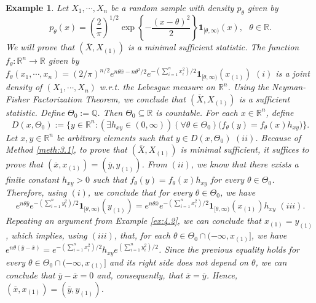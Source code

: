 \documentclass[12pt]{article}
\newtheorem{example}{Example}[section]
\begin{document}
\begin{example}
\label{ex:4.3}
Let $X_1,\cdots, X_n$ be a random sample with density $p_\theta $ given by
$$p_\theta (x)=\left(\frac{2}{\pi }\right)^{1/2}\exp \left\{-\frac{(x-\theta )^2}{2}\right\}\mathbf{1}_{[\theta ,\infty )}(x),\,\,\,\,\theta \in \mathbb{R}.$$
We will prove that $(\overline X,X_{(1)})$ is a minimal sufficient statistic. The function $f_\theta :\mathbb{R}^n\to \mathbb{R}$ given by $f_\theta (x_1,\cdots, x_n)=(2/\pi )^{n/2}e^{n\theta \overline x-n\theta ^2/2}e^{-(\sum _{i=1}^nx_i^2)/2}\mathbf{1}_{[\theta ,\infty )}(x_{(1)})\,\,(i)$ is a joint density of $(X_1,\cdots, X_n)$ w.r.t. the Lebesgue measure on $\mathbb{R}^n$. Using the Neyman-Fisher Factorization Theorem, we conclude that $(\overline X,X_{(1)})$ is a sufficient statistic. Define $\Theta _0:=\mathbb{Q}$. Then $\Theta _0\subseteq\mathbb{R}$ is countable. For each $x\in\mathbb{R}^n$, define
$$D(x,\Theta _0):=\big\{y\in\mathbb{R}^n:(\exists h_{xy}\in (0,\infty ))(\forall \theta \in \Theta _0)\big(f_\theta (y)=f_\theta (x)h_{xy}\big)\big\}.$$
Let $x,y\in\mathbb{R}^n$ be arbitrary elements such that $y\in D(x,\Theta _0)\,\,(ii)$. Because of Method \ref{meth:3.1}, to prove that $(\overline X,X_{(1)})$ is minimal sufficient, it suffices to prove that $(\overline x,x_{(1)})=(\overline y,y_{(1)})$. From $(ii)$, we know that there exists a finite constant $h_{xy}>0$ such that $f_\theta (y)=f_\theta (x)h_{xy}$ for every $\theta\in\Theta _0$. Therefore, using $(i)$, we conclude that for every $\theta\in\Theta _0$, we have
$$e^{n\theta \overline y }e^{-(\sum _{i=1}^ny_i^2)/2}\mathbf{1}_{[\theta ,\infty )}(y_{(1)})=e^{n\theta \overline x }e^{-(\sum _{i=1}^nx_i^2)/2}\mathbf{1}_{[\theta ,\infty )}(x_{(1)})h_{xy}\,\,(iii).$$
Repeating an argument from Example \ref{ex:4.2}, we can conclude that $x_{(1)}=y_{(1)}$, which implies, using $(iii)$, that, for each $\theta\in\Theta _0\cap (-\infty ,x_{(1)}]$, we have $e^{n\theta (\overline y-\overline x) }=e^{-(\sum _{i=1}^nx_i^2)/2}h_{xy}e^{(\sum _{i=1}^ny_i^2)/2}$. Since the previous equality holds for every $\theta\in\Theta _0\cap (-\infty ,x_{(1)}]$ and its right side does not depend on $\theta$, we can conclude that $\overline y-\overline x=0$ and, consequently, that $\overline x=\overline y$. Hence, $(\overline x,x_{(1)})=(\overline y,y_{(1)})$.
\end{example}
\end{document}
